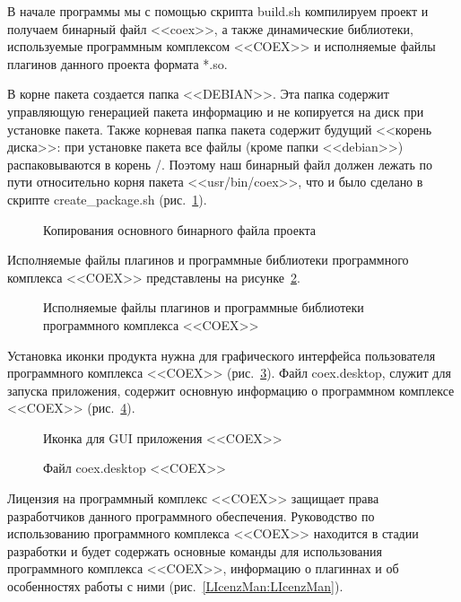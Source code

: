 В начале программы мы с помощью скрипта build.sh компилируем проект и получаем бинарный файл <<coex>>, а также динамические библиотеки, используемые программным комплексом <<COEX>> и исполняемые файлы плагинов данного проекта формата *.so. 

В корне пакета создается папка <<DEBIAN>>. Эта папка содержит управляющую генерацией пакета информацию и не копируется на диск при установке пакета.
Также корневая папка пакета содержит будущий <<корень диска>>: при установке пакета все файлы (кроме папки <<debian>>) распаковываются в корень /. Поэтому наш бинарный файл должен лежать по пути относительно корня пакета <<usr/bin/coex>>, что и было сделано в скрипте create\_package.sh (рис.~\ref{cpcoex:cpcoex}). 

\begin{figure}[h!]
\caption{Копирования основного бинарного файла проекта}
\label{cpcoex:cpcoex}
\end{figure}

Исполняемые файлы плагинов и программные библиотеки программного комплекса <<COEX>> представлены на рисунке~\ref{PluginsAndLibs:PluginsAndLibs}.

\begin{figure}[h!]
\caption{Исполняемые файлы плагинов и программные библиотеки программного комплекса <<COEX>>}
\label{PluginsAndLibs:PluginsAndLibs}
\end{figure}

Установка иконки продукта нужна для графического интерфейса пользователя программного комплекса <<COEX>> (рис.~\ref{image:image}). Файл coex.desktop, служит для запуска приложения, содержит основную информацию о программном комплексе <<COEX>> (рис.~\ref{Aplicatio:Aplicatio}).

\begin{figure}[h!]
\caption{ Иконка для GUI приложения <<COEX>> }
\label{image:image}
\end{figure}


\begin{figure}[h!]
\caption{ Файл coex.desktop <<COEX>> }
\label{Aplicatio:Aplicatio}
\end{figure}

Лицензия на программный комплекс <<COEX>> защищает права разработчиков данного программного обеспечения. Руководство по использованию программного комплекса <<COEX>> находится в стадии разработки и будет содержать основные команды для использования программного комплекса <<COEX>>, информацию о плагиннах и об особенностях работы с ними (рис.~\ref{LIcenzMan:LIcenzMan}).

